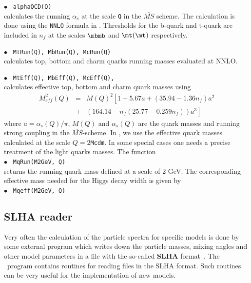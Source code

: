 \documentclass[12pt,a4paper]{article}
\begin{document}
\noindent$\bullet$ \verb| alphaQCD(Q)|\\
calculates the  running $\alpha_s$ at the scale \verb|Q| in the
$\overline{MS}$ scheme. The calculation is done using the
\verb|NNLO| formula in \cite{Eidelman:2004wy}. Thresholds for the 
b-quark and t-quark  are included in  $n_f$ at the scales $\mbmb$
and $\mt(\mt)$ respectively.

\noindent$\bullet$ \verb| MtRun(Q), MbRun(Q), McRun(Q) | \\
calculates top, bottom and charm quarks running masses evaluated
at NNLO.

\noindent$\bullet$ \verb| MtEff(Q), MbEff(Q), McEff(Q),  | \\
calculates effective top, bottom and charm quark masses using
~\cite{Eidelman:2004wy}
\begin{eqnarray}
\label{meff}
 M_{eff}^2(Q)&=&M(Q)^2\left[1+5.67a + (35.94-1.36n_f)a^2 \right.\nonumber\\
 &+& \left.(164.14-n_f(25.77-0.259n_f))a^3\right]
\end{eqnarray}
where $a=\alpha_s(Q)/\pi$,    $M(Q)$  and $\alpha_s(Q)$    are the
quark masses and running strong coupling  in the
$\overline{MS}$-scheme. In \micro, we use the effective
quark masses calculated at the scale $Q=2${\tt Mcdm}.
In some special cases one needs a precise treatment of the light quarks masses. The function\\
\noindent$\bullet$ \verb| MqRun(M2GeV, Q)| \\
returns the  running quark mass defined at a scale of 2 GeV. The corresponding
effective mass needed for the Higgs decay width is given by \\
\noindent$\bullet$ \verb| Mqeff(M2GeV, Q)|


\subsection{SLHA reader}
\label{SLHA} 
Very often the calculation of the particle spectra for specific 
models is done by some external program which writes down 
the particle masses, mixing angles and other 
model parameters in a file with the so-called  {\bf SLHA} format~\cite{Skands:2003cj,Allanach:2008qq}. 
The \micro\ program contains routines for  reading files in the SLHA format. 
Such routines can be very useful for the implementation of new models.
\end{document}
